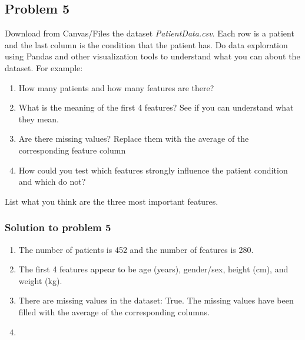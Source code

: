 \documentclass[12pt]{article}%
\begin{document}
\subsection{Problem 5}

Download from Canvas/Files the dataset \emph{PatientData.csv}. Each row is a patient and the last column is the condition that the patient has. Do data exploration using Pandas and other visualization tools to understand what you can about the dataset. For example:
\begin{enumerate}
    \item How many patients and how many features are there?
    \item What is the meaning of the first 4 features? See if you can understand what they mean.
    \item Are there missing values? Replace them with the average of the corresponding feature column
    \item How could you test which features strongly influence the patient condition and which do not? 
\end{enumerate}

List what you think are the three most important features.

\subsubsection{Solution to problem 5}

\begin{enumerate}
    \item The number of patients is 452 and the number of features is 280.
    \item The first 4 features appear to be age (years), gender/sex, height (cm), and weight (kg).
    \item There are missing values in the dataset: True. The missing values have been filled with the average of the corresponding columns.
    \item 
\end{enumerate} 
\end{document}
